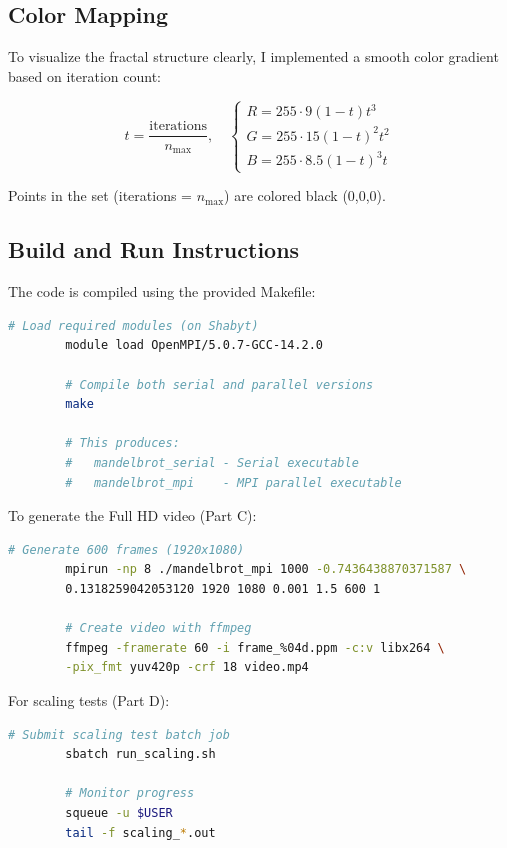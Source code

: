 \documentclass[11pt,a4paper]{article}
\begin{document}
	\subsection{Color Mapping}
	
	To visualize the fractal structure clearly, I implemented a smooth color gradient based on iteration count:
	
	\begin{equation}
		t = \frac{\text{iterations}}{n_{\text{max}}}, \quad
		\begin{cases}
			R = 255 \cdot 9(1-t)t^3 \\
			G = 255 \cdot 15(1-t)^2 t^2 \\
			B = 255 \cdot 8.5(1-t)^3 t
		\end{cases}
	\end{equation}
	
	Points in the set (iterations = $n_{\text{max}}$) are colored black (0,0,0).
	
	\subsection{Build and Run Instructions}
	
	The code is compiled using the provided Makefile:
	
	\begin{lstlisting}[language=bash,caption={Build commands},label={lst:build}]
		# Load required modules (on Shabyt)
		module load OpenMPI/5.0.7-GCC-14.2.0
		
		# Compile both serial and parallel versions
		make
		
		# This produces:
		#   mandelbrot_serial - Serial executable
		#   mandelbrot_mpi    - MPI parallel executable
	\end{lstlisting}
	
	To generate the Full HD video (Part C):
	\begin{lstlisting}[language=bash,caption={Video generation}]
		# Generate 600 frames (1920x1080)
		mpirun -np 8 ./mandelbrot_mpi 1000 -0.7436438870371587 \
		0.1318259042053120 1920 1080 0.001 1.5 600 1
		
		# Create video with ffmpeg
		ffmpeg -framerate 60 -i frame_%04d.ppm -c:v libx264 \
		-pix_fmt yuv420p -crf 18 video.mp4
	\end{lstlisting}
	
	For scaling tests (Part D):
	\begin{lstlisting}[language=bash,caption={Shabyt batch submission}]
		# Submit scaling test batch job
		sbatch run_scaling.sh
		
		# Monitor progress
		squeue -u $USER
		tail -f scaling_*.out
	\end{lstlisting}
	
\end{document}
